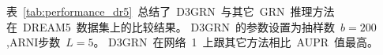 表~\ref{tab:performance_dr5}~总结了~D3GRN~与其它~GRN~推理方法在~DREAM5~数据集上的比较结果。
D3GRN~的参数设置为抽样数~$b=200$,ARNI步数~$L=5$。
D3GRN~在网络~1~上跟其它方法相比~AUPR~值最高。


